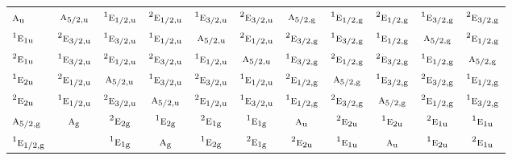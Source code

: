 \documentclass[10pt,a4paper]{article}
\numberwithin{equation}{section}
\newcommand{\irr}[1]{\text{\normalfont\scshape #1}}
\newcommand{\conjpair}[1]{{}^{#1}}
\newcommand{\ptag}[1]{\mathrm{#1}}
\begin{document}
{\begin{longtable}{@{}lcccccccccc@{}}
$\irr{a}_{\ptag{u}}$ & $\irr{a}_{5/2,\ptag{u}}$ & $\conjpair{1}\irr{e}_{1/2,\ptag{u}}$ & $\conjpair{2}\irr{e}_{1/2,\ptag{u}}$ & $\conjpair{1}\irr{e}_{3/2,\ptag{u}}$ & $\conjpair{2}\irr{e}_{3/2,\ptag{u}}$ & $\irr{a}_{5/2,\ptag{g}}$ & $\conjpair{1}\irr{e}_{1/2,\ptag{g}}$ & $\conjpair{2}\irr{e}_{1/2,\ptag{g}}$ & $\conjpair{1}\irr{e}_{3/2,\ptag{g}}$ & $\conjpair{2}\irr{e}_{3/2,\ptag{g}}$\\
$\conjpair{1}\irr{e}_{1\ptag{u}}$ & $\conjpair{2}\irr{e}_{3/2,\ptag{u}}$ & $\conjpair{1}\irr{e}_{3/2,\ptag{u}}$ & $\conjpair{1}\irr{e}_{1/2,\ptag{u}}$ & $\irr{a}_{5/2,\ptag{u}}$ & $\conjpair{2}\irr{e}_{1/2,\ptag{u}}$ & $\conjpair{2}\irr{e}_{3/2,\ptag{g}}$ & $\conjpair{1}\irr{e}_{3/2,\ptag{g}}$ & $\conjpair{1}\irr{e}_{1/2,\ptag{g}}$ & $\irr{a}_{5/2,\ptag{g}}$ & $\conjpair{2}\irr{e}_{1/2,\ptag{g}}$\\
$\conjpair{2}\irr{e}_{1\ptag{u}}$ & $\conjpair{1}\irr{e}_{3/2,\ptag{u}}$ & $\conjpair{2}\irr{e}_{1/2,\ptag{u}}$ & $\conjpair{2}\irr{e}_{3/2,\ptag{u}}$ & $\conjpair{1}\irr{e}_{1/2,\ptag{u}}$ & $\irr{a}_{5/2,\ptag{u}}$ & $\conjpair{1}\irr{e}_{3/2,\ptag{g}}$ & $\conjpair{2}\irr{e}_{1/2,\ptag{g}}$ & $\conjpair{2}\irr{e}_{3/2,\ptag{g}}$ & $\conjpair{1}\irr{e}_{1/2,\ptag{g}}$ & $\irr{a}_{5/2,\ptag{g}}$\\
$\conjpair{1}\irr{e}_{2\ptag{u}}$ & $\conjpair{2}\irr{e}_{1/2,\ptag{u}}$ & $\irr{a}_{5/2,\ptag{u}}$ & $\conjpair{1}\irr{e}_{3/2,\ptag{u}}$ & $\conjpair{2}\irr{e}_{3/2,\ptag{u}}$ & $\conjpair{1}\irr{e}_{1/2,\ptag{u}}$ & $\conjpair{2}\irr{e}_{1/2,\ptag{g}}$ & $\irr{a}_{5/2,\ptag{g}}$ & $\conjpair{1}\irr{e}_{3/2,\ptag{g}}$ & $\conjpair{2}\irr{e}_{3/2,\ptag{g}}$ & $\conjpair{1}\irr{e}_{1/2,\ptag{g}}$\\
$\conjpair{2}\irr{e}_{2\ptag{u}}$ & $\conjpair{1}\irr{e}_{1/2,\ptag{u}}$ & $\conjpair{2}\irr{e}_{3/2,\ptag{u}}$ & $\irr{a}_{5/2,\ptag{u}}$ & $\conjpair{2}\irr{e}_{1/2,\ptag{u}}$ & $\conjpair{1}\irr{e}_{3/2,\ptag{u}}$ & $\conjpair{1}\irr{e}_{1/2,\ptag{g}}$ & $\conjpair{2}\irr{e}_{3/2,\ptag{g}}$ & $\irr{a}_{5/2,\ptag{g}}$ & $\conjpair{2}\irr{e}_{1/2,\ptag{g}}$ & $\conjpair{1}\irr{e}_{3/2,\ptag{g}}$\\
$\irr{a}_{5/2,\ptag{g}}$ & $\irr{a}_{\ptag{g}}$ & $\conjpair{2}\irr{e}_{2\ptag{g}}$ & $\conjpair{1}\irr{e}_{2\ptag{g}}$ & $\conjpair{2}\irr{e}_{1\ptag{g}}$ & $\conjpair{1}\irr{e}_{1\ptag{g}}$ & $\irr{a}_{\ptag{u}}$ & $\conjpair{2}\irr{e}_{2\ptag{u}}$ & $\conjpair{1}\irr{e}_{2\ptag{u}}$ & $\conjpair{2}\irr{e}_{1\ptag{u}}$ & $\conjpair{1}\irr{e}_{1\ptag{u}}$\\
$\conjpair{1}\irr{e}_{1/2,\ptag{g}}$ &  & $\conjpair{1}\irr{e}_{1\ptag{g}}$ & $\irr{a}_{\ptag{g}}$ & $\conjpair{1}\irr{e}_{2\ptag{g}}$ & $\conjpair{2}\irr{e}_{1\ptag{g}}$ & $\conjpair{2}\irr{e}_{2\ptag{u}}$ & $\conjpair{1}\irr{e}_{1\ptag{u}}$ & $\irr{a}_{\ptag{u}}$ & $\conjpair{1}\irr{e}_{2\ptag{u}}$ & $\conjpair{2}\irr{e}_{1\ptag{u}}$\\

\end{longtable}}
\end{document}
